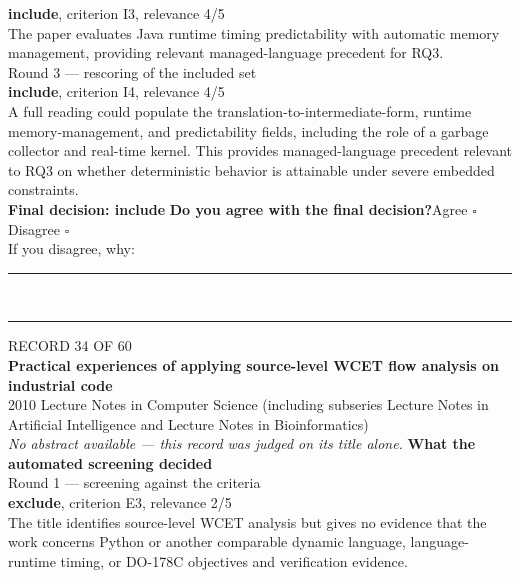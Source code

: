 \documentclass[11pt,a4paper]{article}
\begin{document}
{\small\textbf{include}, criterion I3, relevance 4/5}\\[0.5mm]
{\small The paper evaluates Java runtime timing predictability with automatic memory management, providing relevant managed-language precedent for RQ3.}\\[2.5mm]
{\footnotesize\color{soft}Round 3 --- rescoring of the included set}\\[0.5mm]
{\small\textbf{include}, criterion I4, relevance 4/5}\\[0.5mm]
{\small A full reading could populate the translation-to-intermediate-form, runtime memory-management, and predictability fields, including the role of a garbage collector and real-time kernel. This provides managed-language precedent relevant to RQ3 on whether deterministic behavior is attainable under severe embedded constraints.}\\[2.5mm]
{\small\textbf{Final decision: include}}
\vspace{2mm}
{\small\textbf{Do you agree with the final decision?}\quad{}Agree $\square$\qquad{}Disagree $\square$}\\[1mm]
{\footnotesize\color{soft}If you disagree, why:}\\[1mm]
\color{rule}\rule{\linewidth}{0.3pt}\\[3mm]\rule{\linewidth}{0.3pt}\color{black}
\clearpage
{\color{soft}\footnotesize RECORD 34 OF 60}\\[1mm]
{\large\bfseries Practical experiences of applying source-level WCET flow analysis on industrial code}\\[1.5mm]
{\color{soft}\small 2010 \textperiodcentered{} Lecture Notes in Computer Science (including subseries Lecture Notes in Artificial Intelligence and Lecture Notes in Bioinformatics)}\\[2mm]
{\small\itshape\color{soft}No abstract available --- this record was judged on its title alone.}
\vspace{3mm}
\vspace{2.5mm}
{\small\textbf{What the automated screening decided}}\\[2mm]
{\footnotesize\color{soft}Round 1 --- screening against the criteria}\\[0.5mm]
{\small\textbf{exclude}, criterion E3, relevance 2/5}\\[0.5mm]
{\small The title identifies source-level WCET analysis but gives no evidence that the work concerns Python or another comparable dynamic language, language-runtime timing, or DO-178C objectives and verification evidence.}\\[2.5mm]
\end{document}
